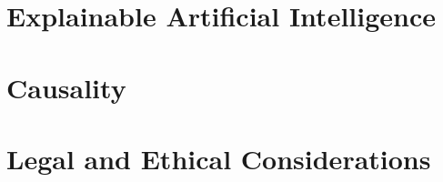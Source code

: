 

\section{Explainable Artificial Intelligence}\label{subsec:xai}




\section{Causality}\label{causalml}




\section{Legal and Ethical Considerations}



